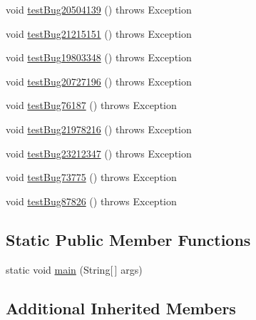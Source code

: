 \begin{DoxyCompactItemize}
\item 
void \mbox{\hyperlink{classtestsuite_1_1regression_1_1_meta_data_regression_test_ae79b95fa80f4d41af56448aa53d865bb}{test\+Bug20504139}} ()  throws Exception 
\item 
void \mbox{\hyperlink{classtestsuite_1_1regression_1_1_meta_data_regression_test_ae3ea7a46828ed0725464d309295a2663}{test\+Bug21215151}} ()  throws Exception 
\item 
void \mbox{\hyperlink{classtestsuite_1_1regression_1_1_meta_data_regression_test_ae07cbe1ade492b69942cdbb52c4ef65a}{test\+Bug19803348}} ()  throws Exception 
\item 
void \mbox{\hyperlink{classtestsuite_1_1regression_1_1_meta_data_regression_test_a4c0d9aaa7ffb0619d60cd9801b2afcba}{test\+Bug20727196}} ()  throws Exception 
\item 
void \mbox{\hyperlink{classtestsuite_1_1regression_1_1_meta_data_regression_test_a59b663373c79eec136ca0c2473dac25c}{test\+Bug76187}} ()  throws Exception 
\item 
void \mbox{\hyperlink{classtestsuite_1_1regression_1_1_meta_data_regression_test_a375e1a8c67204d8fcbbca1bd9957881d}{test\+Bug21978216}} ()  throws Exception 
\item 
void \mbox{\hyperlink{classtestsuite_1_1regression_1_1_meta_data_regression_test_ab3ee32d4d432ff0acdba1990e9dde9ba}{test\+Bug23212347}} ()  throws Exception 
\item 
void \mbox{\hyperlink{classtestsuite_1_1regression_1_1_meta_data_regression_test_ab626be438fcdf7bbb6d528f00a7dda1d}{test\+Bug73775}} ()  throws Exception 
\item 
void \mbox{\hyperlink{classtestsuite_1_1regression_1_1_meta_data_regression_test_a0182fb63c3dfdf76644200cbca0614db}{test\+Bug87826}} ()  throws Exception 
\end{DoxyCompactItemize}
\subsection*{Static Public Member Functions}
\begin{DoxyCompactItemize}
\item 
static void \mbox{\hyperlink{classtestsuite_1_1regression_1_1_meta_data_regression_test_a2bc970731305062a2b670cd771ed1287}{main}} (String\mbox{[}$\,$\mbox{]} args)
\end{DoxyCompactItemize}
\subsection*{Additional Inherited Members}


